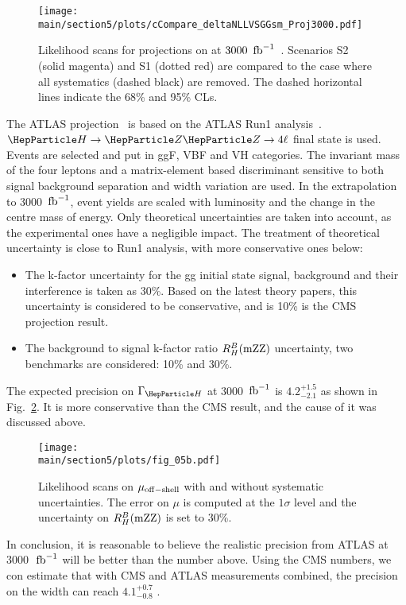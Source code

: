\begin{figure*}[!htbp]
\centering
\texttt{[image: \\main/section5/plots/cCompare\_deltaNLLVSGGsm\_Proj3000.pdf]}
\caption
{
Likelihood scans for projections on \GH at $3000~\,{\rm fb}^{-1}$~\cite{CMS-PAS-FTR-18-011}. Scenarios S2 (solid magenta) and S1 (dotted red) are compared to the case where all systematics (dashed black) are removed. The dashed horizontal lines indicate the 68\% and 95\% CLs. 
}
\label{fig:GH-projections}
\end{figure*}


The ATLAS projection~\cite{ATL-PHYS-PUB-2015-024} is based on the ATLAS Run1 analysis~\cite{PhysRevD.91.012006}. $\PH\to\PZ\PZ\to4\ell$ final state is used. Events are selected and put in ggF, VBF and VH categories. The invariant mass of the four leptons and a matrix-element based discriminant sensitive to both signal background separation and width variation are used. In the extrapolation to 3000 $\,{\rm fb}^{-1}$, event yields are scaled with luminosity and the change in the centre mass of energy. Only theoretical uncertainties are taken into account, as the experimental ones have a negligible impact. The treatment of theoretical uncertainty is close to Run1 analysis, with more conservative ones below: 
\begin{itemize}
	\item {The k-factor uncertainty for the gg initial state signal, background and their interference is taken as 30\%. Based on the latest theory papers, this uncertainty is considered to be conservative, and is 10\% is the CMS projection result.}
	\item {The background to signal k-factor ratio $R^{B}_{H}(\rm{mZZ})$ uncertainty, two benchmarks are considered: 10\% and 30\%. }
\end{itemize}
The expected precision on $\GH$ at 3000 $\,{\rm fb}^{-1}$ is $4.2^{+1.5}_{-2.1}$ \UMeV as shown in Fig.~\ref{fig:ATLAS_projections}. It is more conservative than the CMS result, and the cause of it was discussed above. 
\begin{figure*}[!htbp]
\centering
\texttt{[image: \\main/section5/plots/fig\_05b.pdf]}
\caption{Likelihood scans on $\mu_{\rm{off-shell}}$ with and without systematic uncertainties. The error on $\mu$ is computed at the $1\sigma$ level and the uncertainty on $R^{B}_{H}(\rm{mZZ})$ is set to 30\%.}
\label{fig:ATLAS_projections}
\end{figure*}

In conclusion, it is reasonable to believe the realistic precision from ATLAS at 3000~$\,{\rm fb}^{-1}$ will be better than the number above. Using the CMS numbers, we con estimate that with CMS and ATLAS measurements combined, the precision on the width can reach $4.1 ^{+0.7}_{-0.8}$ \UMeV. 

